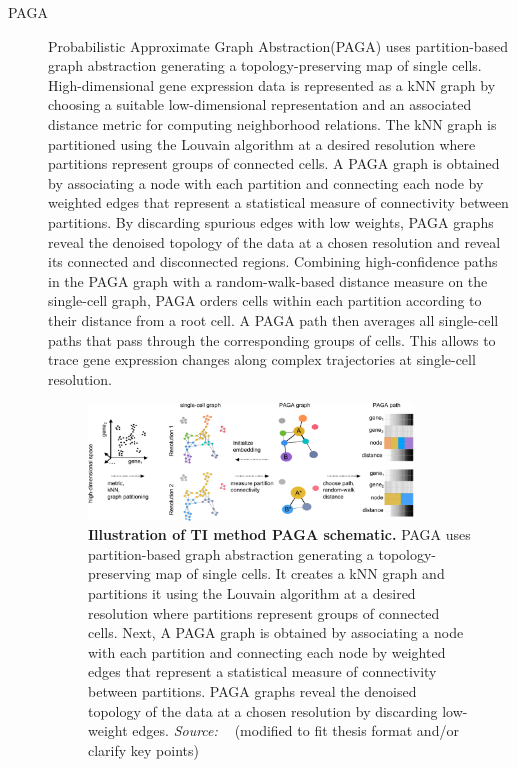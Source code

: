 \begin{description}
    \item[PAGA]
    Probabilistic Approximate Graph Abstraction(PAGA) uses partition-based graph abstraction generating a topology-preserving map of single cells\citep{wolf2019paga}. High-dimensional gene expression data is represented as a kNN graph by choosing a suitable low-dimensional representation and an associated distance metric for computing neighborhood relations. The kNN graph is partitioned using the Louvain algorithm at a desired resolution where partitions represent groups of connected cells. A PAGA graph is obtained by associating a node with each partition and connecting each node by weighted edges that represent a statistical measure of connectivity between partitions. By discarding spurious edges with low weights, PAGA graphs reveal the denoised topology of the data at a chosen resolution and reveal its connected and disconnected regions. Combining high-confidence paths in the PAGA graph with a random-walk-based distance measure on the single-cell graph, PAGA orders cells within each partition according to their distance from a root cell. A PAGA path then averages all single-cell paths that pass through the corresponding groups of cells. This allows to trace gene expression changes along complex trajectories at single-cell resolution.
    \begin{figure}[ht!]
    	\centering
    	\includegraphics[width=0.85\textwidth]{TI_Alg_PAGA/fig}
    	\vspace{0.1cm}
    	\caption[Illustration of TI method PAGA schematic.]{\textbf{Illustration of TI method PAGA schematic.} 
    	PAGA uses partition-based graph abstraction generating a topology-preserving map of single cells. It creates a kNN graph and partitions it using the Louvain algorithm at a desired resolution where partitions represent groups of connected cells. Next, A PAGA graph is obtained by associating a node with each partition and connecting each node by weighted edges that represent a statistical measure of connectivity between partitions. PAGA graphs reveal the denoised topology of the data at a chosen resolution by discarding low-weight edges. \emph{Source: ~\cite{wolf2019paga}} (modified to fit thesis format and/or clarify key points)
    	}
    	\label{fig:TI_Alg_PAGA}
    \end{figure}
        

\end{description}
